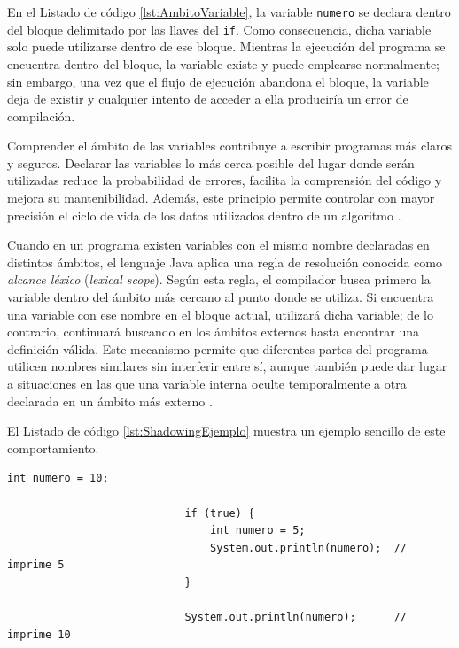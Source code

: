 \documentclass[12pt,twoside]{book}
\begin{document}
						\noindent
						En el Listado de código \ref{lst:AmbitoVariable}, la variable \texttt{numero} se declara dentro del bloque delimitado por las llaves del \texttt{if}. Como consecuencia, dicha variable solo puede utilizarse dentro de ese bloque. Mientras la ejecución del programa se encuentra dentro del bloque, la variable existe y puede emplearse normalmente; sin embargo, una vez que el flujo de ejecución abandona el bloque, la variable deja de existir y cualquier intento de acceder a ella produciría un error de compilación.
						
						Comprender el ámbito de las variables contribuye a escribir programas más claros y seguros. Declarar las variables lo más cerca posible del lugar donde serán utilizadas reduce la probabilidad de errores, facilita la comprensión del código y mejora su mantenibilidad. Además, este principio permite controlar con mayor precisión el ciclo de vida de los datos utilizados dentro de un algoritmo \cite{Pressman2019Software,Sommerville2015Software}.
						
						Cuando en un programa existen variables con el mismo nombre declaradas en distintos ámbitos, el lenguaje Java aplica una regla de resolución conocida como \textit{alcance léxico} (\textit{lexical scope}). Según esta regla, el compilador busca primero la variable dentro del ámbito más cercano al punto donde se utiliza. Si encuentra una variable con ese nombre en el bloque actual, utilizará dicha variable; de lo contrario, continuará buscando en los ámbitos externos hasta encontrar una definición válida. Este mecanismo permite que diferentes partes del programa utilicen nombres similares sin interferir entre sí, aunque también puede dar lugar a situaciones en las que una variable interna oculte temporalmente a otra declarada en un ámbito más externo \cite{Sebesta2018Concepts,Pierce2002Types}.
						
						El Listado de código \ref{lst:ShadowingEjemplo} muestra un ejemplo sencillo de este comportamiento.
						
						\begin{lstlisting}[style=Java,caption={Ejemplo de shadowing en Java.},label={lst:ShadowingEjemplo}]
							int numero = 10;
							
							if (true) {
								int numero = 5;
								System.out.println(numero);  // imprime 5
							}
							
							System.out.println(numero);      // imprime 10
						\end{lstlisting}
						
\end{document}
